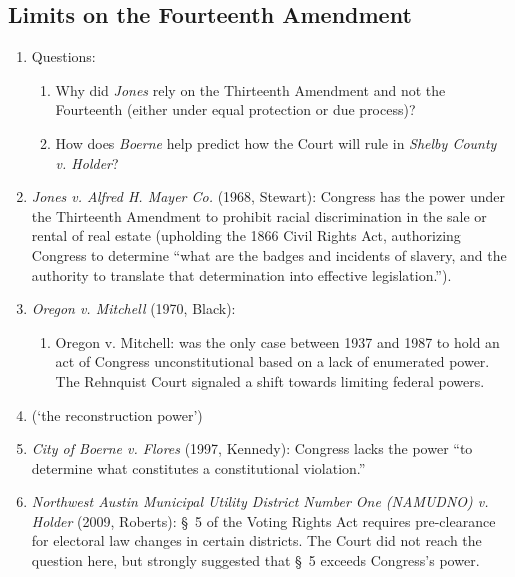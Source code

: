 \subsection{Limits on the Fourteenth Amendment}

\begin{enumerate}
    \item Questions:
    \begin{enumerate}
        \item Why did \emph{Jones} rely on the Thirteenth Amendment and not 
        the Fourteenth (either under equal protection or due process)?
        \item How does \emph{Boerne} help predict how the Court will rule in 
        \emph{Shelby County v. Holder}?
    \end{enumerate}
    \item \emph{Jones v. Alfred H. Mayer Co. } (1968, Stewart): Congress has the 
    power under the Thirteenth Amendment to prohibit racial discrimination in 
    the sale or rental of real estate (upholding the 1866 Civil Rights Act, 
    authorizing Congress to determine ``what are the badges and incidents of 
    slavery, and the authority to translate that determination into effective 
    legislation.'').
    \item \emph{Oregon v. Mitchell} (1970, Black): %
    \begin{enumerate}
        \item Oregon v. Mitchell: was the only case between 1937 and 1987 to 
        hold an act of Congress unconstitutional based on a lack of enumerated 
        power. The Rehnquist Court signaled a shift towards limiting federal 
        powers.
    \end{enumerate}
    \item (`the reconstruction power') %
    \item \emph{City of Boerne v. Flores} (1997, Kennedy): Congress lacks the 
    power ``to determine what constitutes a constitutional violation.''
    \item \emph{Northwest Austin Municipal Utility District Number One 
    (NAMUDNO) v. Holder} (2009, Roberts): \S\ 5 of the Voting Rights Act 
    requires pre-clearance for electoral law changes in certain districts. The 
    Court did not reach the question here, but strongly suggested that \S\ 5 
    exceeds Congress's power.
\end{enumerate}
